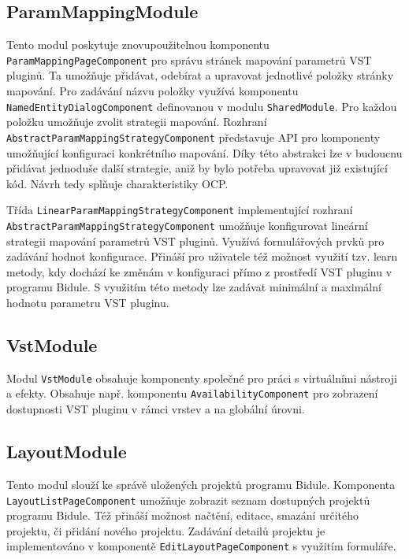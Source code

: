 \documentclass[thesis=M,czech]{FITthesis}[2019/03/06]
\begin{document}
		\subsection{ParamMappingModule}
			Tento modul poskytuje znovupoužitelnou komponentu \texttt{Param\-Mapping\-Page\-Component} pro správu stránek mapování parametrů VST pluginů. Ta umožňuje přidávat, odebírat a upravovat jednotlivé položky stránky mapování. Pro zadávání názvu položky
			využívá komponentu \texttt{Named\-Entity\-Dialog\-Component} definovanou v modulu \texttt{SharedModule}.			
			Pro každou položku umožňuje zvolit strategii mapování. Rozhraní \texttt{Abstract\-Param\-Mapping\-Strategy\-Component} představuje API pro komponenty umožňující konfiguraci konkrétního mapování. Díky této abstrakci lze v budoucnu přidávat jednoduše další 
			strategie, aniž by bylo potřeba upravovat již existující kód. Návrh tedy splňuje charakteristiky OCP\cite{ocp}.
			
			Třída \texttt{Linear\-Param\-Mapping\-Strategy\-Component} implementující rozhraní \texttt{Abstract\-Param\-Mapping\-Strategy\-Component}
			umožňuje konfigurovat lineární strategii mapování parametrů VST pluginů. Využívá formulářových prvků pro zadávání
			hodnot konfigurace. Přináší pro uživatele též možnost využití tzv. learn metody, kdy dochází ke změnám v konfiguraci
			přímo z prostředí VST pluginu v programu Bidule. S využitím této metody lze zadávat minimální a maximální hodnotu
			parametru VST pluginu.		
		
		\subsection{VstModule}
			Modul \texttt{VstModule} obsahuje komponenty společné pro práci s virtuálními nástroji a efekty.
			Obsahuje např. komponentu \texttt{Availability\-Component} pro zobrazení dostupnosti VST pluginu v rámci vrstev a na globální úrovni.
			
		\subsection{LayoutModule}
			Tento modul slouží ke správě uložených projektů programu Bidule.
			Komponenta \texttt{Layout\-List\-Page\-Component} umožňuje zobrazit seznam dostupných projektů programu Bidule.
			Též přináší možnost načtění, editace, smazání určitého projektu, či přidání nového projektu. 
			Zadávání detailů projektu je implementováno v komponentě \texttt{Edit\-Layout\-Page\-Component} s využitím formuláře.			
\end{document}
